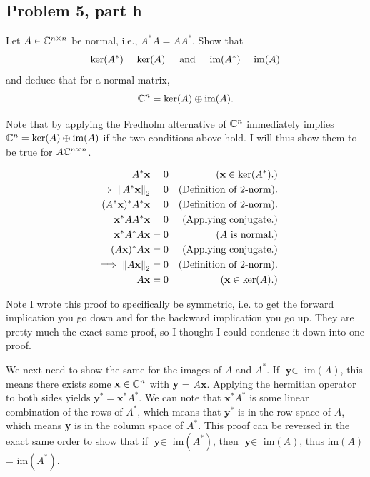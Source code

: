 \subsection{Problem 5, part h}
Let $A \in \mathbb{C}^{n \times n}$ be normal, i.e., $A^*A = AA^*$. Show that 
\[
\ker(A^*) = \ker(A) \hspace{5mm} \text{and} \hspace{5mm} \text{im}(A^*) = \text{im}(A)  
\]
and deduce that for a normal matrix, 
\[
\mathbb{C}^n = \ker (A) \oplus \text{im}(A).
\]
\partbreak
\begin{solution}
    Note that by applying the Fredholm alternative of $\mathbb{C}^n$ immediately implies $\mathbb{C}^n = \ker (A) \oplus \text{im}(A)$ if the two conditions above hold. I will thus show them to be true for $A \mathbb{C}^{n\times n}$. 

    \alignbreak
    \begin{align}
        A^*\textbf{x} &= 0 &\text{($\textbf{x} \in \ker(A^*)$.)}\nonumber\\
        \implies \norm{A^*\textbf{x}}_2 &= 0 &\text{(Definition of $2$-norm).} \nonumber\\
        (A^*\textbf{x})^*A^*\textbf{x} &= 0 &\text{(Definition of $2$-norm).} \nonumber\\
        \textbf{x}^*AA^*\textbf{x} &= 0 &\text{(Applying conjugate.)}\nonumber\\
        \textbf{x}^*A^*A\textbf{x} &= 0 &\text{($A$ is normal.)}\nonumber\\
        (A\textbf{x})^*A\textbf{x} &= 0 &\text{(Applying conjugate.)}\nonumber\\
        \implies \norm{A\textbf{x}}_2 &= 0 &\text{(Definition of $2$-norm).}\nonumber\\ 
         A\textbf{x} &= 0 &\text{($\textbf{x} \in \ker(A)$.)}\nonumber
    \end{align}
    \alignbreak

    Note I wrote this proof to specifically be symmetric, i.e. to get the forward implication you go down and for the backward implication you go up. They are pretty much the exact same proof, so I thought I could condense it down into one proof. 

    \jump
    We next need to show the same for the images of $A$ and $A^*$. If $\textbf{y} \in $ im$(A)$, this means there exists some $\textbf{x} \in \mathbb{C}^n$ with \textbf{y} = $A\textbf{x}$. Applying the hermitian operator to both sides yields $\textbf{y}^* = \textbf{x}^*A^*$. We can note that $\textbf{x}^*A^*$ is some linear combination of the rows of $A^*$, which means that $\textbf{y}^*$ is in the row space of $A$, which means \textbf{y} is in the column space of $A^*$. This proof can be reversed in the exact same order to show that if $\textbf{y} \in $ im$(A^*)$, then $\textbf{y} \in $ im$(A)$, thus im$(A)$ = im$(A^*)$.  
\end{solution}

